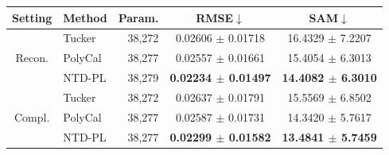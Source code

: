 \begin{tabular}{@{}c l r c c@{}}
\toprule
Setting & Method & Param. & RMSE$\downarrow$ & SAM$\downarrow$ \\
\midrule
    \multirow{3}{*}{Recon.} & Tucker & 38,272 & 0.02606 $\pm$ 0.01718 & 16.4329 $\pm$ 7.2207 \\
     & PolyCal & 38,277 & 0.02557 $\pm$ 0.01661 & 15.4054 $\pm$ 6.3013 \\
     & NTD-PL & 38,279 & \textbf{0.02234 $\pm$ 0.01497} & \textbf{14.4082 $\pm$ 6.3010} \\
    \midrule
    \multirow{3}{*}{Compl.} & Tucker & 38,272 & 0.02637 $\pm$ 0.01791 & 15.5569 $\pm$ 6.8502 \\
     & PolyCal & 38,277 & 0.02587 $\pm$ 0.01731 & 14.3420 $\pm$ 5.7617 \\
     & NTD-PL & 38,277 & \textbf{0.02299 $\pm$ 0.01582} & \textbf{13.4841 $\pm$ 5.7459} \\
\bottomrule
\end{tabular}
